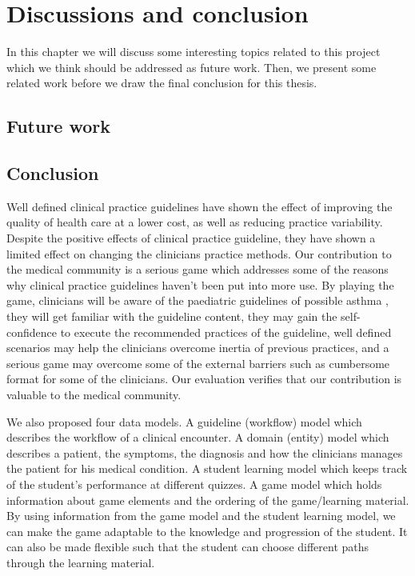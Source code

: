 \documentclass[a4paper,12pt,oneside]{book}
\begin{document}
\chapter{Discussions and conclusion}
In this chapter we will discuss some interesting topics related to this project which we think should be addressed as future work. Then, we present some related work before we draw the final conclusion for this thesis.
\section{Future work}

%
\section{Conclusion}
Well defined clinical practice guidelines have shown the effect of improving the quality of health care at a lower cost, as well as reducing practice variability. Despite the positive effects of clinical practice guideline, they have shown a limited effect on changing the clinicians practice methods. Our contribution to the medical community is a serious game which addresses some of the reasons why clinical practice guidelines haven't been put into more use. By playing the game, clinicians will be aware of the paediatric guidelines of possible asthma \parencite{RepublicofKeny2016}, they will get familiar with the guideline content, they may gain the self-confidence to execute the recommended practices of the guideline, well defined scenarios may help the clinicians overcome inertia of previous practices, and a serious game may overcome some of the external barriers such as cumbersome format for some of the clinicians. Our evaluation verifies that our contribution is valuable to the medical community.

We also proposed four data models. A guideline (workflow) model which describes the workflow of a clinical encounter. A domain (entity) model which describes a patient, the symptoms, the diagnosis and how the clinicians manages the patient for his medical condition. A student learning model which keeps track of the student's performance at different quizzes. A game model which holds information about game elements and the ordering of the game/learning material. By using information from the game model and the student learning model, we can make the game adaptable to the knowledge and progression of the student. It can also be made flexible such that the student can choose different paths through the learning material.
\end{document}
